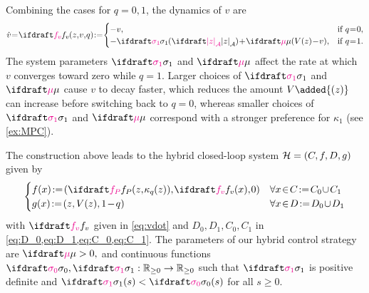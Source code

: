 Combining the cases for $q=0, 1$, the dynamics of $v$ are 
\begin{equation}
    \squeezespaces{0.2}
    \dot v 
    = \fv(z, v, q)
    := 
    \begin{cases}
                                                  -v, & \textif q = 0, \\
        -\sigmaone(\distA{z}) + \vdiffcoeff(V(z) - v), & \textif q = 1.
    \end{cases}
    \label{eq:vdot}
\end{equation}
The system parameters $\sigmaone$ and $\vdiffcoeff$ 
affect the rate at which $v$ converges toward zero while $q=1$.
Larger choices of $\sigmaone$ and $\vdiffcoeff$ cause $v$ to decay faster, 
which reduces the amount $V\added{(z)}$ can increase before switching back to $q=0$, 
whereas smaller choices of $\sigmaone$ and $\vdiffcoeff$ 
correspond with a stronger preference for $\kappa_1$ 
(see \cref{ex:MPC}).


The construction above leads to the hybrid closed-loop system 
${\mathcal{H}} = (C, f, D, g)$  given by 
\begin{equation} \squeezespaces{0.4}
    \hspace{-1pt}\begin{cases}
    f(x) := (\fp(z, \kappa_q(z)), \fv(x), 0)
            & \forall x \in C := C_0 \cup C_1 \\ 
    g(x) := (z,\: V(z),\: 1 - q) & \forall x\in D := D_0 \cup D_1
\end{cases}
\label{eq:switched hybrid system}
\end{equation}
with $\fv$ given in \cref{eq:vdot} 
and $D_0, D_1, C_0, C_1$ 
in \cref{eq:D_0,eq:D_1,eq:C_0,eq:C_1}.
The parameters of our hybrid control strategy are 
$\vdiffcoeff > 0,$
and continuous functions $\sigmazero, \sigmaone : \nnreals \to \nnreals$ 
such that $\sigmaone$ is positive definite and 
$\sigmaone(s) < \sigmazero(s)$ for all $s\geq 0.$

